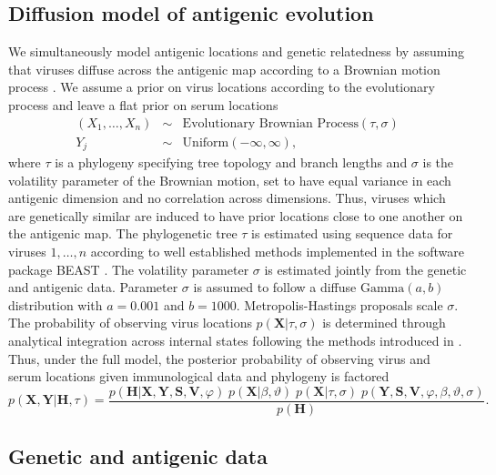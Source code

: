 \documentclass[11pt,oneside,letterpaper]{article}
\newcommand{\mdssd}{\varphi}						%
\newcommand{\diffusionsd}{\sigma}					%
\newcommand{\tree}{\tau}							%
\newcommand{\vn}{n}									%
\begin{document}
\subsection*{Diffusion model of antigenic evolution}

We simultaneously model antigenic locations and genetic relatedness by assuming that viruses diffuse across the antigenic map according to a Brownian motion process \cite{Lemey10}.
We assume a prior on virus locations according to the evolutionary process and leave a flat prior on serum locations
\begin{eqnarray}
	(X_1,\ldots,X_n) &\sim& \mbox{Evolutionary Brownian Process}(\tree, \diffusionsd) \nonumber \\
	Y_j &\sim& \mathrm{Uniform}( -\infty, \infty ),
\end{eqnarray}
where $\tree$ is a phylogeny specifying tree topology and branch lengths and $\diffusionsd$ is the volatility parameter of the Brownian motion,  set to have equal variance in each antigenic dimension and no correlation across dimensions.
Thus, viruses which are genetically similar are induced to have prior locations close to one another on the antigenic map.
The phylogenetic tree $\tree$ is estimated using sequence data for viruses $1,\ldots,\vn$ according to well established methods implemented in the software package BEAST \cite{BEAST}.
The volatility parameter $\diffusionsd$ is estimated jointly from the genetic and antigenic data.
Parameter $\diffusionsd$ is assumed to follow a diffuse $\mbox{Gamma}(a, b)$ distribution with $a=0.001$ and $b=1000$.
Metropolis-Hastings proposals scale $\diffusionsd$.
The probability of observing virus locations $p(\mathbf{X}|\tree,\diffusionsd)$ is determined through analytical integration across internal states following the methods introduced in \cite{Lemey10}.
Thus, under the full model, the posterior probability of observing virus and serum locations given immunological data and phylogeny is factored
\begin{equation}
	p(\mathbf{X},\mathbf{Y} | \mathbf{H},\tree) = \frac{ p(\mathbf{H}|\mathbf{X},\mathbf{Y},\mathbf{S},\mathbf{V}, \mdssd) \; 
	p(\mathbf{X} | \beta, \vartheta) \;
	p(\mathbf{X} | \tree, \diffusionsd) \; 
	p(\mathbf{Y},\mathbf{S},\mathbf{V},\mdssd,\beta,\vartheta,\diffusionsd)}{ p(\mathbf{H}) }.
\end{equation}

\subsection*{Genetic and antigenic data}
\end{document}
